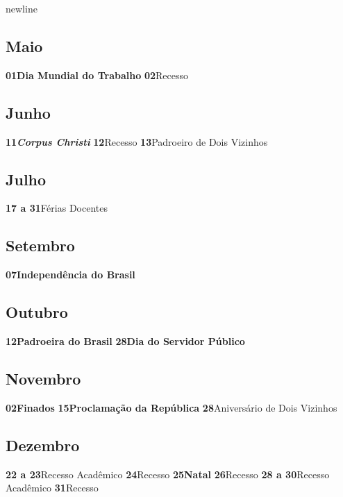 \documentclass[thesis]{hmcposter}
\begin{document}
\begin{poster}
newline\subsection{Maio}\textbf{01}\quad \quad \quad \quad \textbf{Dia Mundial do Trabalho} \newline\textbf{02}\quad \quad \quad \quad Recesso \newline\subsection{Junho}\textbf{11}\quad \quad \quad \quad \textbf{\textit{Corpus Christi}} \newline\textbf{12}\quad \quad \quad \quad Recesso \newline\textbf{13}\quad \quad \quad \quad Padroeiro de Dois Vizinhos \newline\subsection{Julho}\textbf{17 a 31}\quad \quad Férias Docentes \newline\subsection{Setembro}\textbf{07}\quad \quad \quad \quad \textbf{Independência do Brasil} \newline\subsection{Outubro}\textbf{12}\quad \quad \quad \quad \textbf{Padroeira do Brasil} \newline\textbf{28}\quad \quad \quad \quad \textbf{Dia do Servidor Público} \newline\subsection{Novembro}\textbf{02}\quad \quad \quad \quad \textbf{Finados} \newline\textbf{15}\quad \quad \quad \quad \textbf{Proclamação da República} \newline\textbf{28}\quad \quad \quad \quad Aniversário de Dois Vizinhos \newline\subsection{Dezembro}\textbf{22 a 23}\quad \quad Recesso Acadêmico \newline\textbf{24}\quad \quad \quad \quad Recesso \newline\textbf{25}\quad \quad \quad \quad \textbf{Natal} \newline\textbf{26}\quad \quad \quad \quad Recesso \newline\textbf{28 a 30}\quad \quad Recesso Acadêmico \newline\textbf{31}\quad \quad \quad \quad Recesso \newline\newpage

\end{poster}
\end{document}
